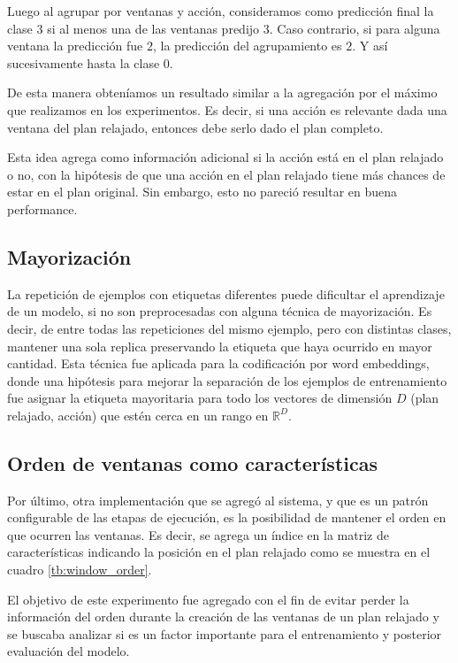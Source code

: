 Luego al agrupar por ventanas y acción, consideramos como predicción final la
clase $3$ si al menos una de las ventanas predijo $3$. Caso contrario, si para
alguna ventana la predicción fue $2$, la predicción del agrupamiento es $2$. Y así
sucesivamente hasta la clase $0$.

De esta manera obteníamos un resultado similar a la agregación por el máximo que
realizamos en los experimentos. Es decir, si una acción es relevante dada una
ventana del plan relajado, entonces debe serlo dado el plan completo.

Esta idea agrega como información adicional si la acción está en el plan
relajado o no, con la hipótesis de que una acción en el plan relajado tiene más
chances de estar en el plan original. Sin embargo, esto no pareció resultar en
buena performance.

\subsection{Mayorización}

La repetición de ejemplos con etiquetas diferentes puede dificultar el
aprendizaje de un modelo, si no son preprocesadas con alguna técnica de
mayorización. Es decir, de entre todas las repeticiones del mismo ejemplo, pero
con distintas clases, mantener una sola replica preservando la etiqueta que haya
ocurrido en mayor cantidad. Esta técnica fue aplicada para la codificación por
word embeddings, donde una hipótesis para mejorar la separación de los ejemplos
de entrenamiento fue asignar la etiqueta mayoritaria para todo los vectores de
dimensión $D$ (plan relajado, acción) que estén cerca en un rango en
$\mathbb{R}^{D}$.

\subsection{Orden de ventanas como características}

Por último, otra implementación que se agregó al sistema, y que es un patrón
configurable de las etapas de ejecución, es la posibilidad de mantener el orden
en que ocurren las ventanas. Es decir, se agrega un índice en la matriz de
características indicando la posición en el plan relajado como se muestra en el
cuadro \ref{tb:window_order}.

\begin{table}[H]
\centering
{}
 \caption{Ventanas de planes relajados y acciones etiquetadas manteniendo el orden de ventanas.}
 \label{tb:window_order}
\end{table}

El objetivo de este experimento fue agregado con el fin de evitar perder la
información del orden durante la creación de las ventanas de un plan relajado y
se buscaba analizar si es un factor importante para el entrenamiento y posterior
evaluación del modelo.
